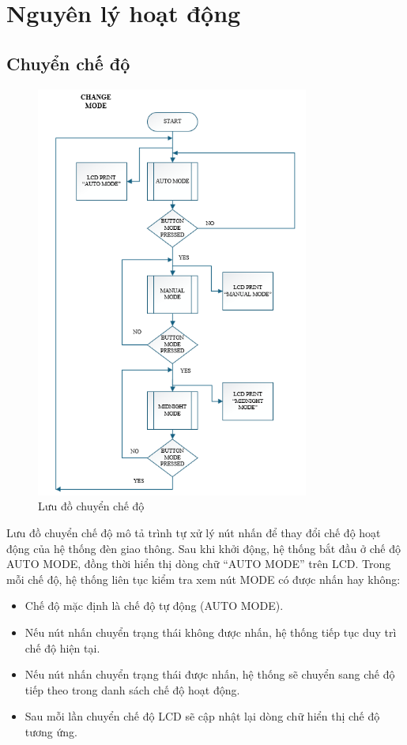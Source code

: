 \section{Nguyên lý hoạt động}
\subsection{Chuyển chế độ}
\begin{figure}[H]
    \centering
    \includegraphics[width=0.8\textwidth]{pictures/modes.png}
    \caption{Lưu đồ chuyển chế độ}
\end{figure}
\cleardoublepage
Lưu đồ chuyển chế độ mô tả trình tự xử lý nút nhấn để thay đổi chế độ hoạt động của hệ thống đèn giao thông. Sau khi khởi động, hệ thống bắt đầu ở chế độ AUTO MODE, đồng thời hiển thị dòng chữ “AUTO MODE” trên LCD. Trong mỗi chế độ, hệ thống liên tục kiểm tra xem nút MODE có được nhấn hay không:
\begin{itemize}
    \item Chế độ mặc định là chế độ tự động (AUTO MODE).
    \item Nếu nút nhấn chuyển trạng thái không được nhấn, hệ thống tiếp tục duy trì chế độ hiện tại.
    \item Nếu nút nhấn chuyển trạng thái được nhấn, hệ thống sẽ chuyển sang chế độ tiếp theo trong danh sách chế độ hoạt động. 
    \item Sau mỗi lần chuyển chế độ LCD sẽ cập nhật lại dòng chữ hiển thị chế độ tương ứng.
\end{itemize}
